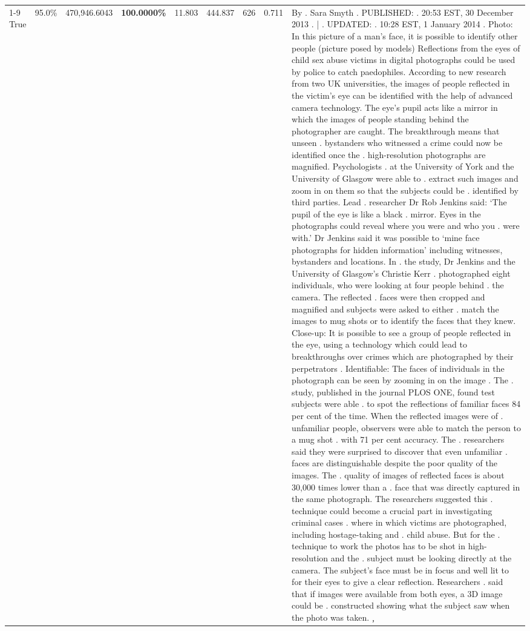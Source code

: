 \begin{table}[H]
\begin{tabular}{lllrlllll}
\cline{1-9}
True & 95.0\% & 470,946.6043 & \bfseries \color{red} 100.0000\% & 11.803 & 444.837 & 626 & 0.711 & By . Sara Smyth . PUBLISHED: . 20:53 EST, 30 December 2013 . | . UPDATED: . 10:28 EST, 1 January 2014 . Photo: In this picture of a man's face, it is possible to identify other people (picture posed by models) Reflections from the eyes of child sex abuse victims in digital photographs could be used by police to catch paedophiles. According to new research from two UK universities, the images of people reflected in the victim's eye can be identified with the help of advanced camera technology. The eye's pupil acts like a mirror in which the images of people standing behind the photographer are caught. The breakthrough means that unseen . bystanders who witnessed a crime could now be identified once the . high-resolution photographs are magnified. Psychologists . at the University of York and the University of Glasgow were able to . extract such images and zoom in on them so that the subjects could be . identified by third parties. Lead . researcher Dr Rob Jenkins said: ‘The pupil of the eye is like a black . mirror. Eyes in the photographs could reveal where you were and who you . were with.' Dr Jenkins said it was possible to ‘mine face photographs for hidden information' including witnesses, bystanders and locations. In . the study, Dr Jenkins and the University of Glasgow's Christie Kerr . photographed eight individuals, who were looking at four people behind . the camera. The reflected . faces were then cropped and magnified and subjects were asked to either . match the images to mug shots or to identify the faces that they knew. Close-up: It is possible to see a group of people reflected in the eye, using a technology which could lead to breakthroughs over crimes which are photographed by their perpetrators . Identifiable: The faces of individuals in the photograph can be seen by zooming in on the image . The . study, published in the journal PLOS ONE, found test subjects were able . to spot the reflections of familiar faces 84 per cent of the time. When the reflected images were of . unfamiliar people, observers were able to match the person to a mug shot . with 71 per cent accuracy. The . researchers said they were surprised to discover that even unfamiliar . faces are distinguishable despite the poor quality of the images. The . quality of images of reflected faces is about 30,000 times lower than a . face that was directly captured in the same photograph. The researchers suggested this . technique could become a crucial part in investigating criminal cases . where in which victims are photographed, including hostage-taking and . child abuse. But for the . technique to work the photos has to be shot in high-resolution and the . subject must be looking directly at the camera. The subject's face must be in focus and well lit to for their eyes to give a clear reflection. Researchers . said that if images were available from both eyes, a 3D image could be . constructed showing what the subject saw when the photo was taken.﹐ \\

\end{tabular}
\end{table}
